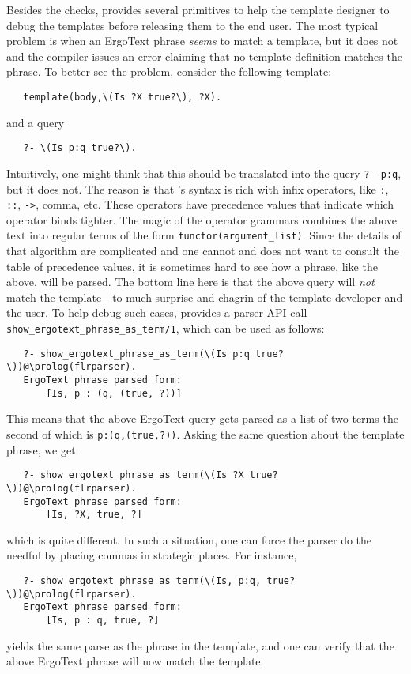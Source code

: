 Besides the checks,
\FLSYSTEM provides several primitives to help the template designer to debug the
templates before releasing them to the end user.
The most typical problem is when an ErgoText phrase \emph{seems} to match
a template, but it does not and the compiler issues an error claiming that
no template definition matches the phrase. To better see the problem,
consider the following template:
\begin{verbatim}
   template(body,\(Is ?X true?\), ?X).
\end{verbatim}
and a query
\begin{verbatim}
   ?- \(Is p:q true?\).
\end{verbatim}
Intuitively, one might think that this should be translated into the query
\texttt{?- p:q}, but it does not. The reason is that \FLSYSTEM's syntax is
rich with infix operators, like \texttt{:}, \texttt{::}, \texttt{->},
comma, etc.  These operators have precedence values that indicate which
operator binds tighter. The magic of the operator grammars combines the
above text into regular terms of the form
\texttt{functor(argument\_list)}. Since the details of that algorithm are
complicated and one cannot and does not want to consult the table of
precedence values, it is sometimes hard to see how a phrase, like the
above, will be parsed. The bottom line here is that the above query will
\emph{not} match the template---to much surprise and chagrin of the
template developer and the user. To help debug such cases, \FLSYSTEM
provides a parser API call \texttt{show\_ergotext\_phrase\_as\_term/1},
which can be used as follows:
\begin{verbatim}
   ?- show_ergotext_phrase_as_term(\(Is p:q true?\))@\prolog(flrparser).
   ErgoText phrase parsed form:
       [Is, p : (q, (true, ?))]
\end{verbatim}
This means that the above ErgoText query gets parsed as a list of two terms
the second of which
is \texttt{p:(q,(true,?))}. Asking the same question about the
template phrase, we get:
\begin{verbatim}
   ?- show_ergotext_phrase_as_term(\(Is ?X true?\))@\prolog(flrparser).
   ErgoText phrase parsed form:
       [Is, ?X, true, ?]
\end{verbatim}
which is quite different. In such a situation, one can force the parser do
the needful by placing commas in strategic places. For instance,
\begin{verbatim}
   ?- show_ergotext_phrase_as_term(\(Is, p:q, true?\))@\prolog(flrparser).
   ErgoText phrase parsed form:
       [Is, p : q, true, ?]
\end{verbatim}
yields the same parse as the phrase in the template, and one can verify
that the above ErgoText phrase will now match the template.

